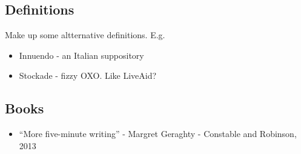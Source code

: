 \documentclass[11pt]{article}
\begin{document}
\subsection*{Definitions}
Make up some altternative definitions. E.g.
\begin{itemize}
\item Innuendo - an Italian suppository
\item Stockade - fizzy OXO. Like LiveAid?
\end{itemize}
\subsection*{Books}
\begin{itemize}
\item ``More five-minute writing'' - Margret Geraghty  - Constable and Robinson, 2013

\end{itemize}
\end{document}
